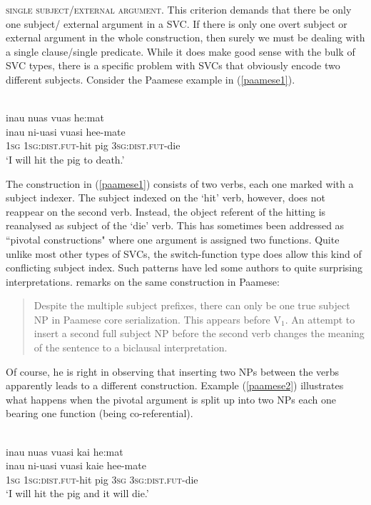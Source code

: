 \textsc{single subject/external argument}. This criterion demands that there be only one subject/ external argument in a SVC. If there is only one overt subject or external argument in the whole construction, then surely we must be dealing with a single clause/single predicate. While it does make good sense with the bulk of SVC types, there is a specific problem with SVCs that obviously encode two different subjects. Consider the Paamese example in (\ref{paamese1}).

\ea \label{paamese1}
\\
\glll inau nuas vuas he:mat \\
inau ni-uasi vuasi hee-mate \\
\textsc{1}\textsc{sg} \textsc{1}\textsc{sg}:\textsc{dist}.\textsc{fut}-hit pig \textsc{3}\textsc{sg}:\textsc{dist}.\textsc{fut}-die \\
\glft `I will hit the pig to death.' \\ 
\z

\largerpage[-1]
The construction in (\ref{paamese1}) consists of two verbs, each one marked with a subject indexer. The subject indexed on the `hit' verb, however, does not reappear on the second verb. Instead, the object referent of the hitting is reanalysed as subject of the `die' verb. This has sometimes been addressed as ``pivotal constructions" where one argument is assigned two functions. Quite unlike most other types of SVCs, the switch-function type does allow this kind of conflicting subject index. Such patterns have led some authors to quite surprising interpretations. \citet[292]{Durie1997} remarks on the same construction in Paamese: \begin{quote}Despite the multiple subject prefixes, there can only be one true subject NP in Paamese core serialization. This appears before V$_1$. An attempt to insert a second full subject NP before the second verb changes the meaning of the sentence to a biclausal interpretation.\end{quote}

Of course, he is right in observing that inserting two NPs between the verbs apparently leads to a different construction. Example (\ref{paamese2}) illustrates what happens when the pivotal argument is split up into two NPs each one bearing one function (being co-referential).

\ea \label{paamese2}
\\
\glll inau nuas vuasi kai he:mat \\
inau ni-uasi vuasi kaie hee-mate \\
\textsc{1}\textsc{sg} \textsc{1}\textsc{sg}:\textsc{dist}.\textsc{fut}-hit pig \textsc{3}\textsc{sg} \textsc{3}\textsc{sg}:\textsc{dist}.\textsc{fut}-die \\
\glft `I will hit the pig and it will die.'\\ 
\z

